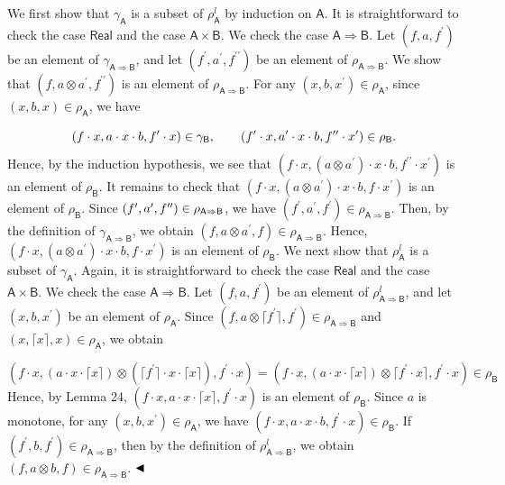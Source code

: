 \documentclass[10pt,a4paper]{amsart}
\begin{document}
We first show that $\gamma_{\mathsf{A}}$ is a subset of $\rho^{l}_{\mathsf{A}}$ by induction on $\mathsf{A}$. It is straightforward to check the case $\mathsf{Real}$ and the case $\mathsf{A}\times\mathsf{B}$. We check the case $\mathsf{A}\Rightarrow\mathsf{B}$. Let $(f,a,f^{\prime})$ be an element of $\gamma_{\mathsf{A}\Rightarrow\mathsf{B}}$, and let $(f^{\prime},a^{\prime},f^{\prime\prime})$ be an element of $\rho_{\mathsf{A}\Rightarrow\mathsf{B}}$. We show that $(f,a\otimes a^{\prime},f^{\prime\prime})$ is an element of $\rho_{\mathsf{A}\Rightarrow\mathsf{B}}$. For any $(x,b,x^{\prime})\in\rho_{\mathsf{A}}$, since $(x,b,x)\in\rho_{\mathsf{A}}$, we have\par
    \[(f\cdot x,a\cdot x\cdot b,f^{\prime}\cdot x)\in\gamma_{\mathsf{B}},\qquad(f^{%
\prime}\cdot x,a^{\prime}\cdot x\cdot b,f^{\prime\prime}\cdot x^{\prime})\in%
\rho_{\mathsf{B}}.\]    
Hence, by the induction hypothesis, we see that $(f\cdot x,(a\otimes a^{\prime})\cdot x\cdot b,f^{\prime\prime}\cdot x^{\prime})$ is an element of $\rho_{\mathsf{B}}$. It remains to check that $(f\cdot x,(a\otimes a^{\prime})\cdot x\cdot b,f\cdot x^{\prime})$ is an element of $\rho_{\mathsf{B}}$. Since $(f^{\prime},a^{\prime},f^{\prime\prime})\in\rho_{\mathsf{A}\Rightarrow\mathsf{%
B}}$, we have $(f^{\prime},a^{\prime},f^{\prime})\in\rho_{\mathsf{A}\Rightarrow\mathsf{B}}$. Then, by the definition of $\gamma_{\mathsf{A}\Rightarrow\mathsf{B}}$, we obtain $(f,a\otimes a^{\prime},f)\in\rho_{\mathsf{A}\Rightarrow\mathsf{B}}$. Hence, $(f\cdot x,(a\otimes a^{\prime})\cdot x\cdot b,f\cdot x^{\prime})$ is an element of $\rho_{\mathsf{B}}$. We next show that $\rho^{l}_{\mathsf{A}}$ is a subset of $\gamma_{\mathsf{A}}$. Again, it is straightforward to check the case $\mathsf{Real}$ and the case $\mathsf{A}\times\mathsf{B}$. We check the case $\mathsf{A}\Rightarrow\mathsf{B}$. Let $(f,a,f^{\prime})$ be an element of $\rho^{l}_{\mathsf{A}\Rightarrow\mathsf{B}}$, and let $(x,b,x^{\prime})$ be an element of $\rho_{\mathsf{A}}$. Since $(f,a\otimes\lceil f^{\prime}\rceil,f^{\prime})\in\rho_{\mathsf{A}\Rightarrow%
\mathsf{B}}$ and $(x,\lceil x\rceil,x)\in\rho_{\mathsf{A}}$, we obtain\par
    \[(f\cdot x,(a\cdot x\cdot\lceil x\rceil)\otimes(\lceil f^{\prime}\rceil\cdot x%
\cdot\lceil x\rceil),f^{\prime}\cdot x)=(f\cdot x,(a\cdot x\cdot\lceil x\rceil%
)\otimes\lceil f^{\prime}\cdot x\rceil,f^{\prime}\cdot x)\in\rho_{\mathsf{B}}\]    
Hence, by Lemma 24, $(f\cdot x,a\cdot x\cdot\lceil x\rceil,f^{\prime}\cdot x)$ is an element of $\rho_{\mathsf{B}}$. Since $a$ is monotone, for any $(x,b,x^{\prime})\in\rho_{\mathsf{A}}$, we have $(f\cdot x,a\cdot x\cdot b,f^{\prime}\cdot x)\in\rho_{\mathsf{B}}$. If $(f^{\prime},b,f^{\prime})\in\rho_{\mathsf{A}\Rightarrow\mathsf{B}}$, then by the definition of $\rho^{l}_{\mathsf{A}\Rightarrow\mathsf{B}}$, we obtain $(f,a\otimes b,f)\in\rho_{\mathsf{A}\Rightarrow\mathsf{B}}$. $\hfill\blacktriangleleft$\par
 
\end{document}
